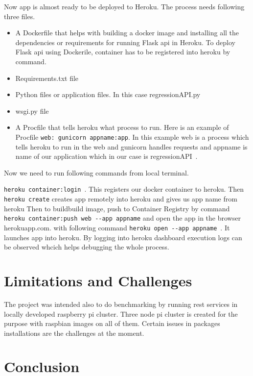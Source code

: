 Now app is almost ready to be deployed to Heroku. The process needs
following three files.

\begin{itemize}
 \item A Dockerfile that helps with building a docker image and installing 
 all the dependencies or requirements for running Flask api in Heroku.
 To deploy Flask api using Dockerile, container has to be registered into 
 heroku by command. 
 \item Requirements.txt file~\cite{hid-sp18-415-regapp}
 \item Python files or application files. In this case regressionAPI.py
 \item wsgi.py file~\cite{hid-sp18-415-regapp}
 \item A Procfile that tells heroku what process to run. Here is an example 
 of Procfile \verb|web: gunicorn appname:app|. In this example web is a 
 process which tells heroku to run in the web and gunicorn handles requests
 and appname is name of our application which in our case is 
 regressionAPI~\cite{hid-sp18-415-regressionapi}.
 \end{itemize}
 
 Now we need to run following commands from local terminal.
 
 \verb|heroku container:login|~\cite{hid-sp18-415-heroku-com}. This registers
 our docker container to heroku. Then \verb|heroku create| creates app remotely
 into heroku and gives us app name from heroku
 Then to buildbuild image, push to Container Registry by command 
 \verb|heroku container:push web --app appname| and open the app in the 
 browser  herokuapp.com. with following command
 \verb|heroku open --app appname|~\cite{hid-sp18-415-heroku-com}. It launches 
 app into heroku. By logging into heroku dashboard execution logs can
 be observed whcich helps debugging the whole process. 
 
\section{Limitations and Challenges}
 
The project was intended also to do benchmarking by running rest services in
locally developed raspberry pi cluster. Three node pi cluster is created for the
purpose with raspbian images on all of them. Certain issues in packages 
installations are the challenges at the moment.

\section{Conclusion}

